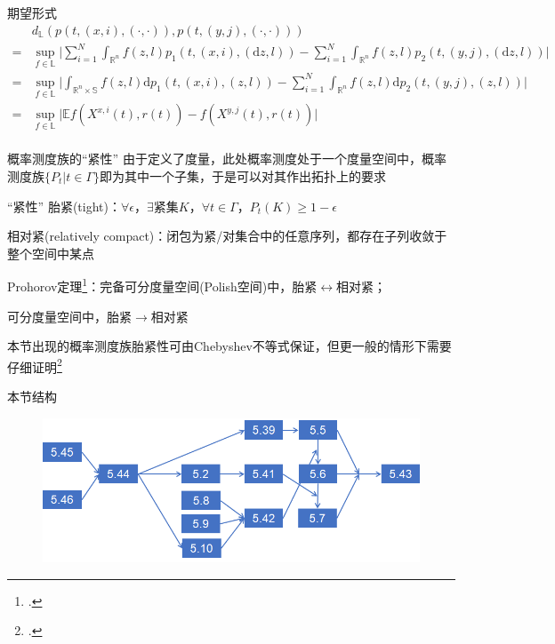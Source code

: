 \documentclass[10pt,aspectratio=43]{beamer}
\begin{document}
\begin{frame}{期望形式}
\begin{align*}
&d_{\mathbb{L}}(p(t,(x,i),(\cdot,\cdot)),p(t,(y,j),(\cdot,\cdot)))\\
={}&\sup_{f\in\mathbb{L}}\Biggl|\sum_{i=1}^{N}\int_{\mathbb{R}^n}f(z,l)p_1(t,(x,i),(\mathrm{d}z,l))-\sum_{i=1}^{N}\int_{\mathbb{R}^n}f(z,l)p_2(t,(y,j),(\mathrm{d}z,l))\Biggr|\\
={}&\sup_{f\in\mathbb{L}}\Biggl|\int_{\mathbb{R}^n\times\mathbb{S}}f(z,l)\mathrm{d}p_1(t,(x,i),(z,l))-\sum_{i=1}^{N}\int_{\mathbb{R}^n}f(z,l)\mathrm{d}p_2(t,(y,j),(z,l))\Biggr|\\
={}&\sup_{f\in\mathbb{L}}\Biggl|\mathbb{E}f(X^{x,i}(t),r(t))-f(X^{y,j}(t),r(t))\Biggr|\\
\end{align*}

\end{frame}

\begin{frame}{概率测度族的“紧性”}
由于定义了度量，此处概率测度处于一个度量空间中，概率测度族$ \{P_t|t\in\Gamma\} $即为其中一个子集，于是可以对其作出拓扑上的要求

\begin{block}{“紧性”}
胎紧(tight)：$ \forall\epsilon $，$ \exists $紧集$ K $，$ \forall t\in\Gamma $，$ P_t(K)\ge 1-\epsilon $

相对紧(relatively compact)：闭包为紧/对集合中的任意序列，都存在子列收敛于整个空间中某点
\end{block}

Prohorov定理\footcite{karatzas_brownian_1998}：完备可分度量空间(Polish空间)中，胎紧$ \leftrightarrow $相对紧；

可分度量空间中，胎紧$ \rightarrow $相对紧

本节出现的概率测度族胎紧性可由Chebyshev不等式保证，但更一般的情形下需要仔细证明\footcite{du_stability_2014}
\end{frame}

\begin{frame}{本节结构}
\begin{figure}
\centering
\includegraphics[width=\linewidth]{2}
\label{fig:2}
\end{figure}

\end{frame}
\end{document}
